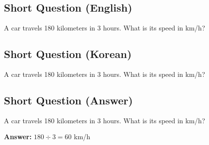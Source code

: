 \cleardoublepage
\subsection*{Short Question (English)}
A car travels 180 kilometers in 3 hours. What is its speed in km/h?


\newpage
\subsection*{Short Question (Korean)}
A car travels 180 kilometers in 3 hours. What is its speed in km/h?


\newpage
\subsection*{Short Question (Answer)}
A car travels 180 kilometers in 3 hours. What is its speed in km/h?

\textbf{Answer:} $180 \div 3 = 60$ km/h
